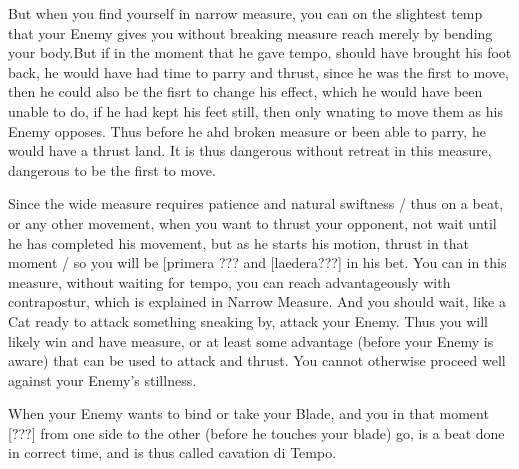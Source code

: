 But when you find yourself in narrow measure, you can on the slightest
temp that your Enemy gives you without breaking measure reach merely
by bending your body.But if in the moment that he gave tempo, should
have brought his foot back, he would have had time to parry and
thrust, since he was the first to move, then he could also be the
fisrt to change his effect, which he would have been unable to do, if
he had kept his feet still, then only wnating to move them as his
Enemy opposes. Thus before he ahd broken measure or been able to
parry, he would have a thrust land. It is thus dangerous without
retreat in this measure, dangerous to be the first to move.


Since the wide measure requires patience and natural swiftness / thus
on a beat, or any other movement, when you want to thrust your
opponent, not wait until he has completed his movement, but as he
starts his motion, thrust in that moment / so you will be [primera ???
and [laedera???] in his bet. You can in this measure, without waiting
for tempo, you can reach advantageously with contrapostur, which is
explained in Narrow Measure. And you should wait, like a Cat ready to
attack something sneaking by, attack your Enemy. Thus you will likely
win and have measure, or at least some advantage (before your Enemy is
aware) that can be used to attack and thrust. You cannot otherwise
proceed well against your Enemy's stillness.



When your Enemy wants to bind or take your Blade, and you in that
moment [???] from one side to the other (before he touches your blade)
go, is a beat done in correct time, and is thus called cavation di Tempo.